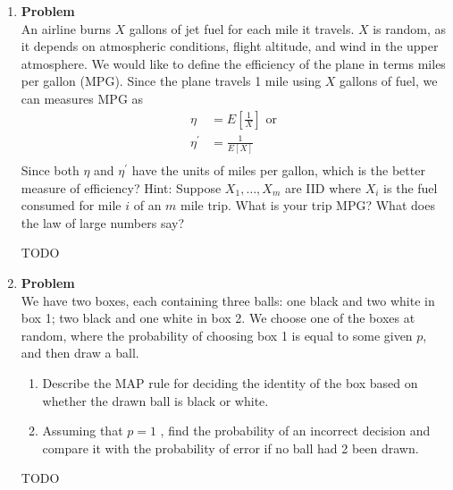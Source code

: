 \documentclass[12pt]{article}
\newenvironment{Ex}{\textbf{Problem}\vspace{.75em}\\}{}
\begin{document}
\begin{enumerate}
\begin{Ex}
    Hint: Consider
    \begin{equation}
      \label{eq:5-hint}
      P(|M_n-a|<e)>c
    \end{equation}
    Where $e$ is the margin of error and $c$ is the confidence level.
    \begin{solution} \hfill
      {\color{red} \huge TODO}
    \end{solution}
  \end{Ex}

\item
  \begin{Ex}
    An airline burns $X$ gallons of jet fuel for each mile it travels. $X$
    is random, as it depends on atmospheric conditions, flight
    altitude, and wind in the upper atmosphere. We would like to
    define the efficiency of the plane in terms miles per gallon
    (MPG). Since the plane travels 1 mile using $X$ gallons of fuel, we
    can measures MPG as
    \begin{equation}
      \label{eq:6-mpg}
      \begin{aligned}
        \eta &= E\left[\frac{1}{X}\right] \text{ or } \\
        \eta^\prime &= \frac{1}{E[X]} \\
      \end{aligned}
    \end{equation}
    Since both $\eta$ and $\eta^\prime$ have the units of miles per gallon,
    which is the better measure of efficiency? Hint: Suppose
    $X_1,\ldots,X_m$ are IID where $X_i$ is the fuel consumed for mile
    $i$ of an $m$ mile trip. What is your trip MPG? What does the law
    of large numbers say?
    \begin{solution} \hfill
      {\color{red} \huge TODO}
    \end{solution}
  \end{Ex}

\item
  \begin{Ex}
    We have two boxes, each containing three balls: one black and two
    white in box 1; two black and one white in box 2. We choose one of
    the boxes at random, where the probability of choosing box 1 is
    equal to some given $p$, and then draw a ball.
    \begin{enumerate}
    \item Describe the MAP rule for deciding the identity of the box
      based on whether the drawn ball is black or white.
    \item Assuming that $p = 1$ , find the probability of an incorrect
      decision and compare it with the probability of error if no ball
      had 2 been drawn.
    \end{enumerate}
    \begin{solution} \hfill
      {\color{red} \huge TODO}
    \end{solution}
  \end{Ex}

\end{enumerate}
\end{document}
